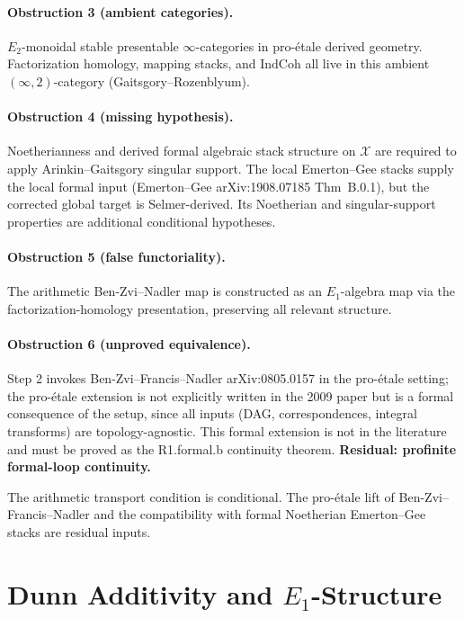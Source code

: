 \paragraph{Obstruction 3 (ambient categories).} \(E_{2}\)-monoidal
stable presentable \(\infty\)-categories in pro-\'etale derived
geometry. Factorization homology, mapping stacks, and
\(\mathrm{IndCoh}\) all live in this ambient \((\infty,2)\)-category
(Gaitsgory--Rozenblyum).

\paragraph{Obstruction 4 (missing hypothesis).} Noetherianness and
derived formal algebraic stack structure on \(\mathcal{X}\) are
required to apply Arinkin--Gaitsgory singular support. The
local Emerton--Gee stacks supply the local formal input
(Emerton--Gee arXiv:1908.07185 Thm~B.0.1), but the corrected global
target is Selmer-derived. Its Noetherian and singular-support
properties are additional conditional hypotheses. 

\paragraph{Obstruction 5 (false functoriality).} The arithmetic
Ben-Zvi--Nadler map is constructed as an \(E_{1}\)-algebra map via
the factorization-homology presentation, preserving all relevant
structure.

\paragraph{Obstruction 6 (unproved equivalence).} Step 2 invokes
Ben-Zvi--Francis--Nadler arXiv:0805.0157 in the pro-\'etale
setting; the pro-\'etale extension is not explicitly written in
the 2009 paper but is a formal consequence of the setup, since
all inputs (DAG, correspondences, integral transforms) are
topology-agnostic. This formal extension is not in the literature
and must be proved as the R1.formal.b continuity theorem.
\textbf{Residual: profinite formal-loop continuity.}


The arithmetic transport condition is conditional. The
pro-\'etale lift of Ben-Zvi--Francis--Nadler and the compatibility
with formal Noetherian Emerton--Gee stacks are residual inputs.

\section{Dunn Additivity and \(E_{1}\)-Structure}
\label{v4-arith:bzn:dunn}

